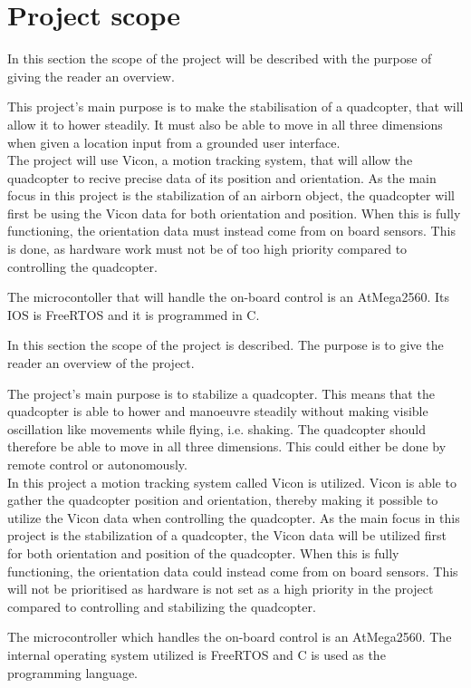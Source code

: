 \section{Project scope}

In this section the scope of the project will be described with the purpose of giving the reader an overview. \newpar

This project's main purpose is to make the stabilisation of a quadcopter, that will allow it to hower steadily. It must also be able to move in all three dimensions when given a location input from a grounded user interface. \\
The project will use Vicon, a motion tracking system, that will allow the quadcopter to recive precise data of its position and orientation. 
As the main focus in this project is the stabilization of an airborn object, the quadcopter will first be using the Vicon data for both orientation and position. When this is fully functioning, the orientation data must instead come from on board sensors. This is done, as hardware work must not be of too high priority compared to controlling the quadcopter. \newpar

The microcontoller that will handle the on-board control is an AtMega2560. Its IOS is FreeRTOS and it is programmed in C. 


In this section the scope of the project is described. The purpose is to give the reader an overview of the project. \newpar

The project's main purpose is to stabilize a quadcopter. This means that the quadcopter is able to hower and manoeuvre steadily without making visible oscillation like movements while flying, i.e. shaking. The quadcopter should therefore be able to move in all three dimensions. This could either be done by remote control or autonomously.  \\
In this project a motion tracking system called Vicon is utilized. Vicon is able to gather the quadcopter position and orientation, thereby making it possible to utilize the Vicon data when controlling the quadcopter. 
As the main focus in this project is the stabilization of a quadcopter, the Vicon data will be utilized first for both orientation and position of the quadcopter. When this is fully functioning, the orientation data could instead come from on board sensors. This will not be prioritised as hardware is not set as a high priority in the project compared to controlling and stabilizing the quadcopter. \newpar

The microcontroller which handles the on-board control is an AtMega2560. The internal operating system utilized is FreeRTOS and C is used as the programming language.